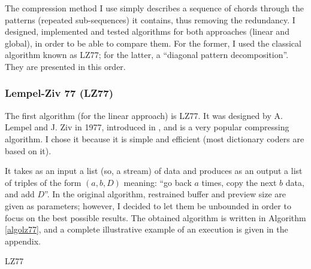 \documentclass[a4paper,10pt]{article}
\newcommand{\guill}[1]{“#1”}
\begin{document}
The compression method I use simply describes a sequence of chords through the patterns (repeated sub-sequences) it contains, thus removing the redundancy. I designed, implemented and tested algorithms for both approaches (linear and global), in order to be able to compare them. For the former, I used the classical algorithm known as LZ77; for the latter, a \guill{diagonal pattern decomposition}. They are presented in this order.


\subsubsection{Lempel-Ziv 77 (LZ77)}

The first algorithm (for the linear approach) is LZ77. It was designed by A. Lempel and J. Ziv in 1977, introduced in \cite{lempelziv}, and is a very popular compressing algorithm. I chose it because it is simple and efficient (most dictionary coders are based on it).

It takes as an input a list (so, a stream) of data and produces as an output a list of triples of the form $(a,b,D)$ meaning: \guill{go back $a$ times, copy the next $b$ data, and add $D$}. In the original algorithm, restrained buffer and preview size are given as parameters; however, I decided to let them be unbounded in order to focus on the best possible results. The obtained algorithm is written in Algorithm \ref{algolz77}, and a complete illustrative example of an execution is given in the appendix.

\begin{algorithm}
\caption{LZ77 \label{algolz77}}
       
   


\end{algorithm}
\end{document}
